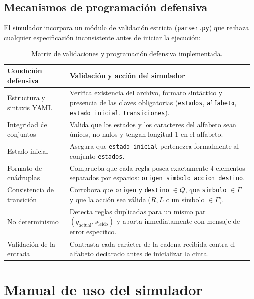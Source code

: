 \documentclass[11pt,letterpaper]{article}
\begin{document}
\subsection{Mecanismos de programación defensiva}
El simulador incorpora un módulo de validación estricta (\texttt{parser.py}) que rechaza cualquier especificación inconsistente antes de iniciar la ejecución:
\begin{table}[h!]
\centering
\small
\begin{tabularx}{\textwidth}{lX}
\toprule
\textbf{Condición defensiva} & \textbf{Validación y acción del simulador} \\
\midrule
Estructura y sintaxis YAML & Verifica existencia del archivo, formato sintáctico y presencia de las claves obligatorias (\texttt{estados}, \texttt{alfabeto}, \texttt{estado\_inicial}, \texttt{transiciones}). \\
Integridad de conjuntos & Valida que los estados y los caracteres del alfabeto sean únicos, no nulos y tengan longitud 1 en el alfabeto. \\
Estado inicial & Asegura que \texttt{estado\_inicial} pertenezca formalmente al conjunto \texttt{estados}. \\
Formato de cuádruplas & Comprueba que cada regla posea exactamente 4 elementos separados por espacios: \texttt{origen simbolo accion destino}. \\
Consistencia de transición & Corrobora que \texttt{origen} y \texttt{destino} $\in Q$, que \texttt{simbolo} $\in \Gamma$ y que la acción sea válida ($R, L$ o un símbolo $\in \Gamma$). \\
No determinismo & Detecta reglas duplicadas para un mismo par $(q_{\text{actual}}, s_{\text{leído}})$ y aborta inmediatamente con mensaje de error específico. \\
Validación de la entrada & Contrasta cada carácter de la cadena recibida contra el alfabeto declarado antes de inicializar la cinta. \\
\bottomrule
\end{tabularx}
\caption{Matriz de validaciones y programación defensiva implementada.}
\end{table}

\section{Manual de uso del simulador}
\end{document}
